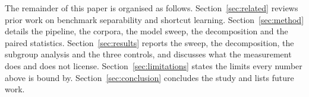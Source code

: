 \documentclass[conference,a4paper]{IEEEtran}
\begin{document}
The remainder of this paper is organised as follows. Section~\ref{sec:related} reviews prior work on benchmark separability and shortcut learning. Section~\ref{sec:method} details the pipeline, the corpora, the model sweep, the decomposition and the paired statistics. Section~\ref{sec:results} reports the sweep, the decomposition, the subgroup analysis and the three controls, and discusses what the measurement does and does not license. Section~\ref{sec:limitations} states the limits every number above is bound by. Section~\ref{sec:conclusion} concludes the study and lists future work.





\end{document}
